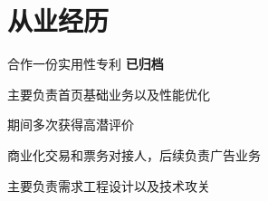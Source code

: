 \documentclass[]{deedy-resume-openfont}
\begin{document}
\begin{minipage}[t]{0.75\textwidth} 
\raggedright %

\section{从业经历}
\sectionsep
{}
\vspace{0.1em}
\vspace{\topsep}
\begin{tightemize}
    \item 合作一份实用性专利 \textbf{已归档}
\end{tightemize}

\vspace{0.1em}
\begin{tightemize}
    \item 主要负责首页基础业务以及性能优化
    \item 期间多次获得高潜评价
\end{tightemize}

\vspace{0.1em}
\begin{tightemize}
    \item 商业化交易和票务对接人，后续负责广告业务
    \item 主要负责需求工程设计以及技术攻关
\end{tightemize}


\end{minipage}
\end{document}
